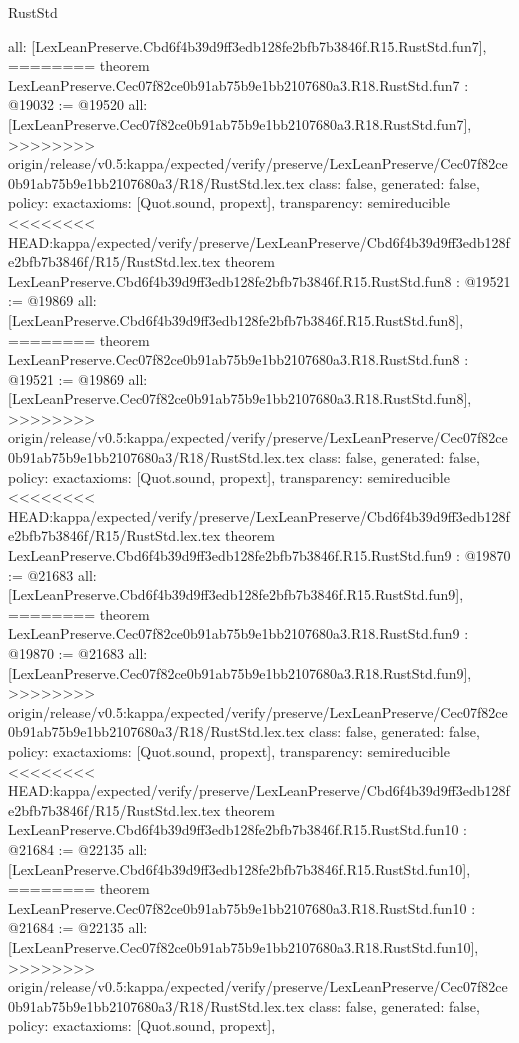 \begin{lexlean}{RustStd}
\begin{coremodule}
{\begin{coremodule}
{{{{{{{{{{  all: [LexLeanPreserve.Cbd6f4b39d9ff3edb128fe2bfb7b3846f.R15.RustStd.fun7],
========
theorem LexLeanPreserve.Cec07f82ce0b91ab75b9e1bb2107680a3.R18.RustStd.fun7 : @19032 := @19520 {
  all: [LexLeanPreserve.Cec07f82ce0b91ab75b9e1bb2107680a3.R18.RustStd.fun7],
>>>>>>>> origin/release/v0.5:kappa/expected/verify/preserve/LexLeanPreserve/Cec07f82ce0b91ab75b9e1bb2107680a3/R18/RustStd.lex.tex
  class: false,
  generated: false,
  policy: exact{axioms: [Quot.sound, propext]},
  transparency: semireducible
}
<<<<<<<< HEAD:kappa/expected/verify/preserve/LexLeanPreserve/Cbd6f4b39d9ff3edb128fe2bfb7b3846f/R15/RustStd.lex.tex
theorem LexLeanPreserve.Cbd6f4b39d9ff3edb128fe2bfb7b3846f.R15.RustStd.fun8 : @19521 := @19869 {
  all: [LexLeanPreserve.Cbd6f4b39d9ff3edb128fe2bfb7b3846f.R15.RustStd.fun8],
========
theorem LexLeanPreserve.Cec07f82ce0b91ab75b9e1bb2107680a3.R18.RustStd.fun8 : @19521 := @19869 {
  all: [LexLeanPreserve.Cec07f82ce0b91ab75b9e1bb2107680a3.R18.RustStd.fun8],
>>>>>>>> origin/release/v0.5:kappa/expected/verify/preserve/LexLeanPreserve/Cec07f82ce0b91ab75b9e1bb2107680a3/R18/RustStd.lex.tex
  class: false,
  generated: false,
  policy: exact{axioms: [Quot.sound, propext]},
  transparency: semireducible
}
<<<<<<<< HEAD:kappa/expected/verify/preserve/LexLeanPreserve/Cbd6f4b39d9ff3edb128fe2bfb7b3846f/R15/RustStd.lex.tex
theorem LexLeanPreserve.Cbd6f4b39d9ff3edb128fe2bfb7b3846f.R15.RustStd.fun9 : @19870 := @21683 {
  all: [LexLeanPreserve.Cbd6f4b39d9ff3edb128fe2bfb7b3846f.R15.RustStd.fun9],
========
theorem LexLeanPreserve.Cec07f82ce0b91ab75b9e1bb2107680a3.R18.RustStd.fun9 : @19870 := @21683 {
  all: [LexLeanPreserve.Cec07f82ce0b91ab75b9e1bb2107680a3.R18.RustStd.fun9],
>>>>>>>> origin/release/v0.5:kappa/expected/verify/preserve/LexLeanPreserve/Cec07f82ce0b91ab75b9e1bb2107680a3/R18/RustStd.lex.tex
  class: false,
  generated: false,
  policy: exact{axioms: [Quot.sound, propext]},
  transparency: semireducible
}
<<<<<<<< HEAD:kappa/expected/verify/preserve/LexLeanPreserve/Cbd6f4b39d9ff3edb128fe2bfb7b3846f/R15/RustStd.lex.tex
theorem LexLeanPreserve.Cbd6f4b39d9ff3edb128fe2bfb7b3846f.R15.RustStd.fun10 : @21684 := @22135 {
  all: [LexLeanPreserve.Cbd6f4b39d9ff3edb128fe2bfb7b3846f.R15.RustStd.fun10],
========
theorem LexLeanPreserve.Cec07f82ce0b91ab75b9e1bb2107680a3.R18.RustStd.fun10 : @21684 := @22135 {
  all: [LexLeanPreserve.Cec07f82ce0b91ab75b9e1bb2107680a3.R18.RustStd.fun10],
>>>>>>>> origin/release/v0.5:kappa/expected/verify/preserve/LexLeanPreserve/Cec07f82ce0b91ab75b9e1bb2107680a3/R18/RustStd.lex.tex
  class: false,
  generated: false,
  policy: exact{axioms: [Quot.sound, propext]},
}}}}}}}}}}}}}}
\end{coremodule}}
\end{coremodule}
\end{lexlean}
